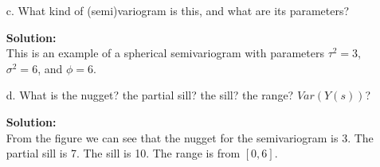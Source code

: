 \documentclass[12pt]{article}
\makeatletter
\theoremstyle{homework}
\newenvironment{exercise}[1]
{\def\@currentlabel{#1}\exercisecore}
{\endexercisecore}
\newcommand{\localhead}[1]{\par\smallskip\noindent\textbf{#1}\nobreak\\}%
\newcommand\solution{\localhead{Solution:}}
\makeatother
\begin{document}
\begin{exercise}{4}
\begin{enumerate}
    




    \item[c.] What kind of (semi)variogram is this, and what are its parameters?\\
    \solution This is an example of a spherical semivariogram with parameters $\tau^2 = 3$, 
    $\sigma^2 = 6$, and $\phi = 6$. 
    \vspace{.15in}


    \item[d.] What is the nugget? the partial sill? the sill? the range? $Var(Y(s))$?\\
    \solution From the figure we can see that the nugget for the semivariogram is 3. The partial sill is 
    7. The sill is 10. The range is from $[0,6]$.
    \vspace{.15in}
  \end{enumerate}
\end{exercise}
\end{document}
